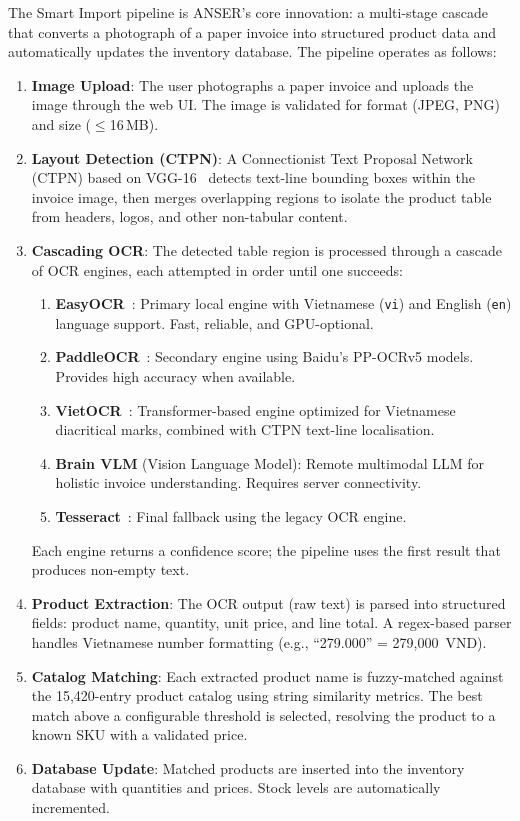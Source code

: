 \documentclass[11pt,a4paper]{report}
\begin{document}
The Smart Import pipeline is ANSER's core innovation: a multi-stage cascade that converts a photograph of a paper invoice into structured product data and automatically updates the inventory database. The pipeline operates as follows:

\begin{enumerate}
  \item \textbf{Image Upload}: The user photographs a paper invoice and uploads the image through the web UI. The image is validated for format (JPEG, PNG) and size ($\leq$16\,MB).

  \item \textbf{Layout Detection (CTPN)}: A Connectionist Text Proposal Network (CTPN) based on VGG-16~\cite{tian2016ctpn} detects text-line bounding boxes within the invoice image, then merges overlapping regions to isolate the product table from headers, logos, and other non-tabular content.

  \item \textbf{Cascading OCR}: The detected table region is processed through a cascade of OCR engines, each attempted in order until one succeeds:
  \begin{enumerate}[label=(\alph*)]
    \item \textbf{EasyOCR}~\cite{easyocr}: Primary local engine with Vietnamese (\texttt{vi}) and English (\texttt{en}) language support. Fast, reliable, and GPU-optional.
    \item \textbf{PaddleOCR}~\cite{paddleocr}: Secondary engine using Baidu's PP-OCRv5 models. Provides high accuracy when available.
    \item \textbf{VietOCR}~\cite{vietocr}: Transformer-based engine optimized for Vietnamese diacritical marks, combined with CTPN text-line localisation.
    \item \textbf{Brain VLM} (Vision Language Model): Remote multimodal LLM for holistic invoice understanding. Requires server connectivity.
    \item \textbf{Tesseract}~\cite{tesseract}: Final fallback using the legacy OCR engine.
  \end{enumerate}
  Each engine returns a confidence score; the pipeline uses the first result that produces non-empty text.

  \item \textbf{Product Extraction}: The OCR output (raw text) is parsed into structured fields: product name, quantity, unit price, and line total. A regex-based parser handles Vietnamese number formatting (e.g., ``279.000'' = 279,000~VND).

  \item \textbf{Catalog Matching}: Each extracted product name is fuzzy-matched against the 15,420-entry product catalog using string similarity metrics. The best match above a configurable threshold is selected, resolving the product to a known SKU with a validated price.

  \item \textbf{Database Update}: Matched products are inserted into the inventory database with quantities and prices. Stock levels are automatically incremented.
\end{enumerate}
\end{document}
